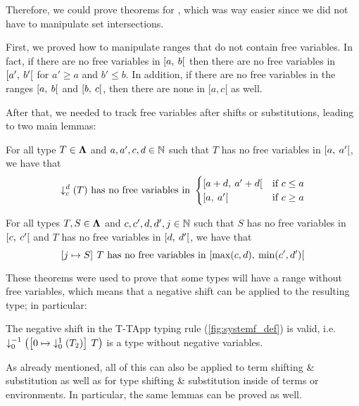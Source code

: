 \noindent
Therefore, we could prove theorems for , which was way easier since we did not have to manipulate set intersections.

First, we proved how to manipulate ranges that do not contain free variables. In fact, if there are no free variables in ${\left[a,\:b\right[}$ then there are no free variables in ${\left[a',\:b'\right[}$ for $a' \geq a$ and $b' \leq b$. In addition, if there are no free variables in the ranges ${\left[a,\:b\right[}$ and ${\left[b,\:c\right[}$, then there are none in $[a, c[$ as well. 

After that, we needed to track free variables after shifts or substitutions, leading to two main lemmas:

\begin{lemma}\label{thm:free_shift}
    For all type $T \in \bm\Lambda$ and $a,a',c,d \in \mathbb{N}$ such that
    $T$ has no free variables in ${\left[a,\:a'\right[}$, we have that
    \[{\downarrow^{d}_{c}\left({T}\right)} \text{ has no free variables in } \begin{cases}
    {\left[a+d,\:a'+d\right[} &\text{if } c \leq a\\
    {\left[a,\:a'\right[} &\text{if } c \geq a
    \end{cases}\]
\end{lemma}

\begin{lemma}\label{thm:free_subst}
    For all types $T, S \in \bm\Lambda$ and $c,c',d, d', j \in \mathbb{N}$ such that
    $S$ has no free variables in ${\left[c,\:c'\right[}$ and $T$ has no free variables in ${\left[d,\:d'\right[}$, we have that
    \[\left[{j} \mapsto{} {S}\right]\:{T} \text{ has no free variables in } {\left[\max(c, d),\:\min(c', d')\right[}\]
\end{lemma}

\noindent
These theorems were used to prove that some types will have a range without free variables, which means that a negative shift can be applied to the resulting type;
in particular:

\begin{ucorollary}
    The negative shift in the \textup{T-TApp} typing rule (\cref{fig:systemf_def}) is valid,
    i.e. ${\downarrow^{-1}_{0}\left({\left[{0} \mapsto{} {{\downarrow^{1}_{0}\left({T_2}\right)}}\right]\:{T}}\right)}$ is a type without negative variables.
\end{ucorollary}

\noindent
As already mentioned, all of this can also be applied to term shifting \& substitution as well as for type shifting \& substitution inside of terms or environments.
In particular, the same lemmas can be proved as well.
